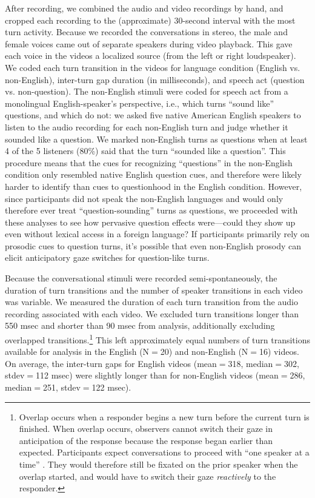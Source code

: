 \documentclass[authoryear, 12pt]{elsarticle}
\begin{document}
After recording, we combined the audio and video recordings by hand, and cropped each recording to the (approximate) 30-second interval with the most turn activity. Because we recorded the conversations in stereo, the male and female voices came out of separate speakers during video playback. This gave each voice in the videos a localized source (from the left or right loudspeaker). We coded each turn transition in the videos for language condition (English vs. non-English), inter-turn gap duration (in milliseconds), and speech act (question vs. non-question). The non-English stimuli were coded for speech act from a monolingual English-speaker's perspective, i.e., which turns ``sound like'' questions, and which do not: we asked five native American English speakers to listen to the audio recording for each non-English turn and judge whether it sounded like a question. We marked non-English turns as questions when at least 4 of the 5 listeners (80\%) said that the turn ``sounded like a question''. This procedure means that the cues for recognizing ``questions'' in the non-English condition only resembled native English question cues, and therefore were likely harder to identify than cues to questionhood in the English condition. However, since participants did not speak the non-English languages and would only therefore ever treat ``question-sounding'' turns as questions, we proceeded with these analyses to see how pervasive question effects were---could they show up even without lexical access in a foreign language? If participants primarily rely on prosodic cues to question turns, it's possible that even non-English prosody can elicit anticipatory gaze switches for question-like turns.

Because the conversational stimuli were recorded semi-spontaneously, the duration of turn transitions and the number of speaker transitions in each video was variable. We measured the duration of each turn transition from the audio recording associated with each video. We excluded turn transitions longer than 550 msec and shorter than 90 msec from analysis, additionally excluding overlapped transitions.\footnote{Overlap occurs when a responder begins a new turn before the current turn is finished. When overlap occurs, observers cannot switch their gaze in anticipation of the response because the response began earlier than expected. Participants expect conversations to proceed with ``one speaker at a time'' \citep{sacks1974}. They would therefore still be fixated on the prior speaker when the overlap started, and would have to switch their gaze \textit{reactively} to the responder.} This left approximately equal numbers of turn transitions available for analysis in the English (N$=$20) and non-English (N$=$16) videos. On average, the inter-turn gaps for English videos (mean$=$318, median$=$302, stdev$=$112 msec) were slightly longer than for non-English videos (mean$=$286, median$=$251, stdev$=$122 msec).
\end{document}
